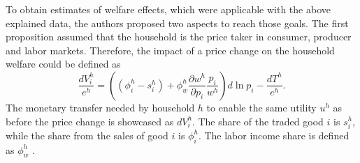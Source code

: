 To obtain estimates of welfare effects, which were applicable with the above explained data, the authors proposed two aspects
to reach those goals. The first proposition assumed that the household is the price taker in consumer, producer and labor markets.
Therefore, the impact of a price change on the household welfare could be defined as
\begin{equation} \label{eq:equation4}
    \frac{dV_{i}^h}{e^h}=((\phi_{i}^h-s_{i}^h)+\phi_{w}^h \frac{\partial w^h}{\partial p_{i}} \frac{p_{i}}{w^h}) d\ln p_{i} -
    \frac{dT^h}{e^h}.
\end{equation}
The monetary transfer needed by household \(h\) to enable the same utility \(u^h\) as before the price change is showcased as 
\(dV_{i}^h\). The share of the traded good \(i\) is \(s_{i}^h\), while the share from the sales of good \(i\) is \(\phi_{i}^h\).
The labor income share is defined as \(\phi_{w}^h\) \parencite[p.~6]{Artuc.2019}.\\


